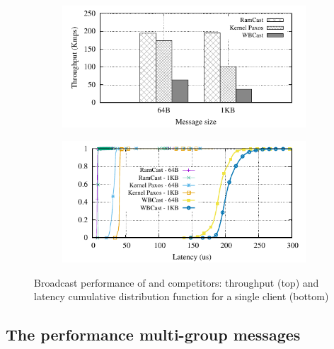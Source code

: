 \begin{figure}[htp!]
  \begin{subfigure}{\columnwidth}
    \advance\leftskip-0.1cm
    \includegraphics[width=0.99\columnwidth]{figures/benchmark/graphs/figure-compare-single-group-throughput}
  \end{subfigure}
  \begin{subfigure}{\columnwidth}
    \centering
    \includegraphics[width=0.95\columnwidth]{figures/benchmark/graphs/figure-compare-single-group-latency-cdf}
  \end{subfigure}
  \caption{Broadcast performance of \libname and competitors: throughput (top) and latency cumulative distribution function for a single client (bottom)}
  \label{fig:broadcast}
\end{figure}


\subsection{The performance multi-group messages}
\label{sec:evaluation:multicast}

